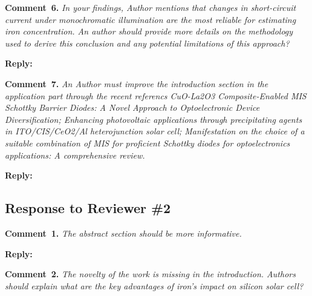 \documentclass[a4paper,fleqn]{cas-sc}
\begin{document}
\vspace{1cm}
\noindent
\textcolor[rgb]{0.00,0.50,1.00}{\textbf{Comment~6.}}
\emph{In your findings, Author mentions that changes in short-circuit current under monochromatic illumination are the most 
reliable for estimating iron concentration. 
An author should provide more details on the methodology used to derive this conclusion and any potential limitations of this approach?}



\noindent
\textcolor[rgb]{0.51,0.00,0.00}{\textbf{Reply:}}




\vspace{1cm}
\noindent
\textcolor[rgb]{0.00,0.50,1.00}{\textbf{Comment~7.}}
\emph{An Author must improve the introduction section in the application part through the recent referencs
CuO-La2O3 Composite-Enabled MIS Schottky Barrier Diodes: A Novel Approach to Optoelectronic Device Diversification; 
Enhancing photovoltaic applications through precipitating agents in ITO/CIS/CeO2/Al heterojunction solar cell; 
Manifestation on the choice of a suitable combination of MIS for proficient Schottky diodes for optoelectronics applications: A comprehensive review.}



\noindent
\textcolor[rgb]{0.51,0.00,0.00}{\textbf{Reply:}}





\subsection*{Response to Reviewer \#2 }

\noindent
\textcolor[rgb]{0.00,0.50,1.00}{\textbf{Comment~1.}}
\emph{The abstract section should be more informative.}

\noindent
\textcolor[rgb]{0.51,0.00,0.00}{\textbf{Reply:}}




\noindent
\textcolor[rgb]{0.00,0.50,1.00}{\textbf{Comment~2.}}
\emph{The novelty of the work is missing in the introduction. Authors should explain what are the key advantages of iron's impact on silicon solar cell?}
\end{document}
